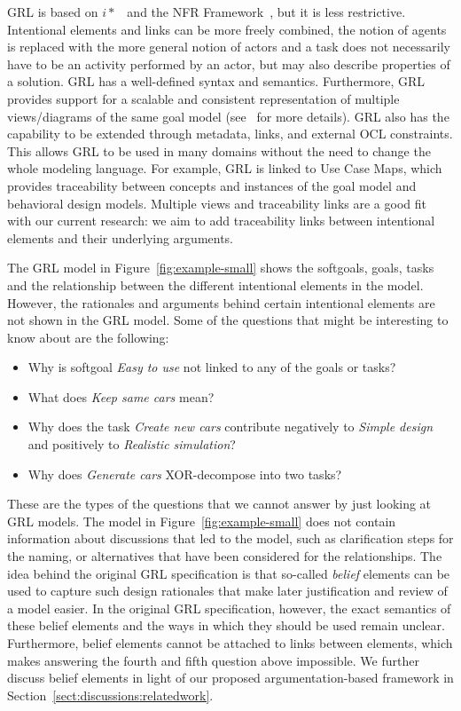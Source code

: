 GRL is based on $i*$~\cite{yu1997towards} and the NFR Framework~\cite{chung2012non}, but it is less restrictive. Intentional elements and links can be more freely combined, the notion of agents is replaced with the more general notion of actors and a task does not necessarily have to be an activity performed by an actor, but may also describe properties of a solution. GRL has a well-defined syntax and semantics. Furthermore, GRL provides support for a scalable and consistent representation of multiple views/diagrams of the same goal model (see~\cite[Ch.2]{Ghanavati2013} for more details). GRL also has the capability to be extended through metadata, links, and external OCL constraints. This allows GRL to be used in many domains without the need to change the whole modeling language. For example, GRL is linked to Use Case Maps, which provides traceability between concepts and instances of the goal model and behavioral design models. Multiple views and traceability links are a good fit with our current research: we aim to add traceability links between intentional elements and their underlying arguments. 

The GRL model in Figure~\ref{fig:example-small} shows the softgoals, goals, tasks and the relationship between the different intentional elements in the model. However, the rationales and arguments behind certain intentional elements are not shown in the GRL model. Some of the questions that might be interesting to know about are the following:

\begin{itemize}
	\item Why is softgoal \emph{Easy to use} not linked to any of the goals or tasks? 
	\item What does \emph{Keep same cars} mean?
	\item Why does the task \emph{Create new cars} contribute negatively to \emph{Simple design} and positively to \emph{Realistic simulation}?
	\item Why does \emph{Generate cars} XOR-decompose into two tasks?
\end{itemize}

These are the types of the questions that we cannot answer by just looking at GRL models. The model in Figure~\ref{fig:example-small} does not contain information about discussions that led to the model, such as clarification steps for the naming, or alternatives that have been considered for the relationships. The idea behind the original GRL specification is that so-called \emph{belief} elements can be used to capture such design rationales that make later justification and review of a model easier. In the original GRL specification, however, the exact semantics of these belief elements and the ways in which they should be used remain unclear. Furthermore, belief elements cannot be attached to links between elements, which makes answering the fourth and fifth question above impossible. We further discuss belief elements in light of our proposed argumentation-based framework in Section~\ref{sect:discussions:relatedwork}. 

